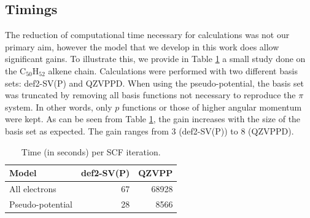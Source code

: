 \documentclass[aip]{revtex4-1}
\begin{document}
\subsection{Timings}
The reduction of computational time necessary for calculations was not our primary aim, however the model that we develop in this work does allow significant gains.
To illustrate this, we provide in Table \ref{tab:time} a small study done on the C$_{50}$H$_{52}$
alkene chain.
Calculations were performed with two different basis sets: def2-SV(P) and QZVPPD.
When using the pseudo-potential, the basis set was truncated by removing all
basis functions not necessary to reproduce the
$\pi$ system.
In other words, only $p$ functions or those of higher angular momentum were kept.
As can be seen from Table \ref{tab:time}, the gain increases
with the size of the basis set as expected.
The gain ranges from 3 (def2-SV(P)) to 8 (QZVPPD).

\begin{table}[ht]
\begin{tabular}{lrr}
\hline\hline
Model            & def2-SV(P) & QZVPP \\
\hline
All electrons    &        67 & 68928 \\
Pseudo-potential &        28 &  8566 \\
\hline\hline
\end{tabular}
\caption{\label{tab:time}Time (in seconds) per SCF iteration.} 
\end{table}
\end{document}
